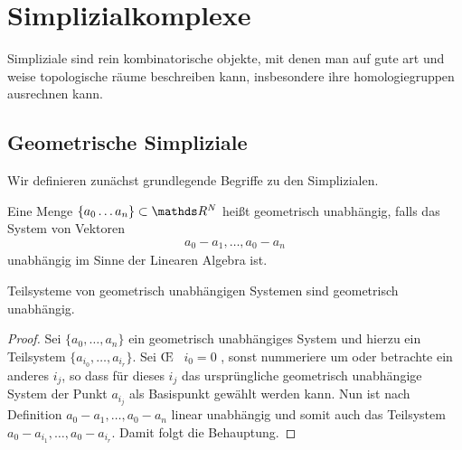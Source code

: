 





\section{Simplizialkomplexe}

Simpliziale sind rein kombinatorische objekte, mit denen man auf gute
art und weise topologische räume beschreiben kann, insbesondere ihre
homologiegruppen ausrechnen kann.

\subsection{Geometrische Simpliziale}


Wir definieren zunächst grundlegende Begriffe zu den Simplizialen.

\begin{Def}
  Eine Menge $\{ a_0\ldots a_n \} \subset \R^N$ heißt geometrisch
  unabhängig, falls das System von Vektoren
  \begin{gather*}
    a_0 - a_1 , \ldots , a_0 - a_n
  \end{gather*}
  unabhängig im Sinne der Linearen Algebra ist.
\end{Def}

\begin{Lem}
  Teilsysteme von geometrisch unabhängigen Systemen sind geometrisch
  unabhängig.
  \begin{proof}
    Sei $\{ a_0 , \ldots , a_n \}$ ein geometrisch unabhängiges System und hierzu 
    ein Teilsystem $\{ a_{i_0},\ldots,a_{i_r} \}$. 
    Sei \OE~ $i_0 = 0$ , sonst nummeriere um oder betrachte ein anderes $i_j$, so dass für dieses $i_j$ das ursprüngliche geometrisch unabhängige System der Punkt $a_{i_j}$ als Basispunkt gewählt werden kann. Nun ist nach Definition $ a_0 - a_1 , \ldots , a_0 - a_n$ linear unabhängig und somit auch das Teilsystem $ a_0 - a_ {i_1}, \ldots , a_0 - a_{i_r}$.
    Damit folgt die Behauptung.
  \end{proof}
\end{Lem}

